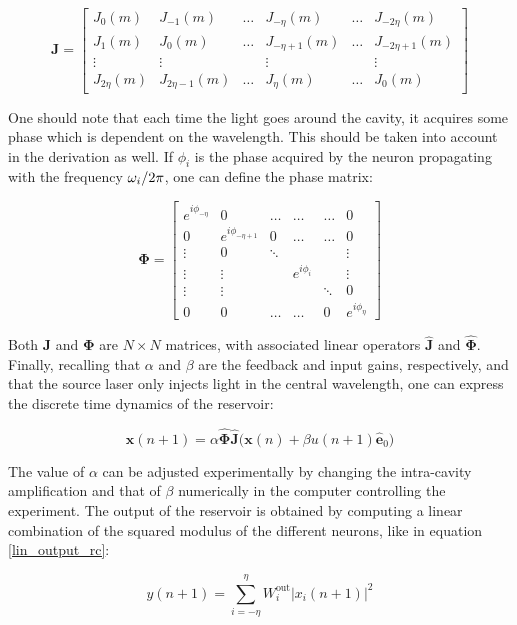 \begin{equation}
	\mathbf{J} = \begin{bmatrix}
		J_0(m) & J_{-1}(m) & \dots & J_{-\eta}(m) & \dots & J_{-2\eta}(m) \\
		J_1(m) & J_0(m) & \dots & J_{-\eta+1}(m) & \dots & J_{-2\eta+1}(m) \\
		\vdots & \vdots &  & \vdots &  & \vdots \\
		J_{2\eta}(m) & J_{2\eta-1}(m) & \dots & J_\eta(m) & \dots & J_0(m)
	\end{bmatrix}
\end{equation}

One should note that each time the light goes around the cavity, it acquires some phase which is dependent on the wavelength. This should be taken into account in the derivation as well. If $\phi_i$ is the phase acquired by the neuron propagating with the frequency $\omega_i/2\pi$, one can define the phase matrix:

\begin{equation}
	\mathbf{\Phi} = \begin{bmatrix}
		e^{i\phi_{-\eta}} & 0 & \dots & \dots & \dots & 0 \\
		0 & e^{i\phi_{-\eta+1}} & 0 & \dots & \dots & 0 \\
		\vdots & 0 & \ddots & & & \vdots \\
		\vdots & \vdots & & e^{i\phi_i} & & \vdots \\
		\vdots & \vdots & & & \ddots & 0 \\
		0 & 0 & \dots & \dots & 0 & e^{i\phi_{\eta}}
	\end{bmatrix}
	\label{phase-matrix}
\end{equation}

Both $\mathbf{J}$ and $\mathbf{\Phi}$ are $N\times N$ matrices, with associated linear operators $\hat{\mathbf{J}}$ and $\hat{\mathbf{\Phi}}$. Finally, recalling that $\alpha$ and $\beta$ are the feedback and input gains, respectively, and that the source laser only injects light in the central wavelength, one can express the discrete time dynamics of the reservoir:

\begin{equation}
	\mathbf{x}(n+1) = \alpha \hat{\mathbf{\Phi}} \hat{\mathbf{J}}\bigg( \mathbf{x}(n) + \beta u(n+1) \hat{\mathbf{e}}_0\bigg)
	\label{model-reservoir}
\end{equation}

The value of $\alpha$ can be adjusted experimentally by changing the intra-cavity amplification and that of $\beta$ numerically in the computer controlling the experiment. The output of the reservoir is obtained by computing a linear combination of the squared modulus of the different neurons, like in equation \eqref{lin_output_rc}:

\begin{equation}
	y(n+1) = \sum_{i=-\eta}^\eta W_i^{\text{out}} | x_i(n+1) |^2
\end{equation}